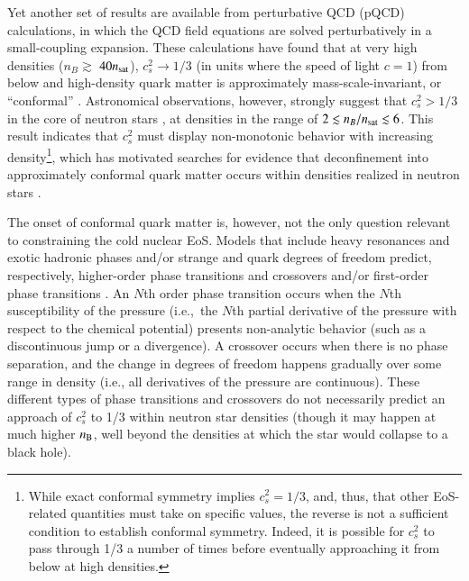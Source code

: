 \documentclass[aps,prd,nofootinbib,tightenlines,notitlepage,floatfix,superscriptaddress,showkeys,twocolumn]{revtex4-1}
\begin{document}
Yet another set of results are available from perturbative QCD (pQCD) calculations, in which the QCD field equations are solved perturbatively in a small-coupling expansion. These calculations have found that at very high densities ($n_B \gtrsim$ $40 n_{\rm sat}$), $c_s^2 \rightarrow 1/3$ (in units where the speed of light $c=1$) from below and high-density quark matter is approximately mass-scale-invariant, or ``conformal'' \cite{Kurkela:2009gj,Kurkela:2014vha,Gorda:2021znl}. Astronomical observations, however, strongly suggest that $c_s^2 > 1/3$ in the core of neutron stars \cite{Legred:2021hdx}, at densities in the range of $2\lesssim n_B/n_{\rm sat} \lesssim 6$. This result indicates that $c_s^2$ must display non-monotonic behavior with increasing density\footnote{While exact conformal symmetry implies $c_s^2 = 1/3$, and, thus, that other EoS-related quantities must take on specific values, the reverse is not a sufficient condition to establish conformal symmetry. Indeed, it is possible for $c_s^2$ to pass through 1/3 a number of times before eventually approaching it from below at high densities.}, which has motivated searches for evidence that deconfinement into approximately conformal quark matter occurs within densities realized in neutron stars \cite{Annala:2023cwx,Annala:2021gom,Annala:2019puf,Marczenko:2022jhl}. 

The onset of conformal quark matter is, however, not the only question relevant to constraining the cold nuclear EoS. Models that include heavy resonances and exotic hadronic phases and/or strange and quark degrees of freedom predict, respectively, higher-order phase transitions and crossovers and/or first-order phase transitions \cite{Buballa:2014jta,Ferreira:2020kvu, Jakobus:2020nxw,Dutra:2015hxa,McLerran:2018hbz, Li:2019fqe,Alford:2017qgh,Zacchi:2015oma,Alvarez-Castillo:2018pve,Zacchi:2019ayh,Zhao:2020dvu,Minamikawa:2020jfj,Duarte:2020xsp,Sen:2020qcd,Minamikawa:2020jfj,Pisarski:2021aoz,Stone:2019blq,Kapusta:2021ney,Somasundaram:2021ljr,Motornenko:2019arp,Baym:2019iky,Baym:2017whm,Malfatti:2020onm}. An $N$th order phase transition occurs when the $N$th susceptibility of the pressure (i.e.,~the $N$th partial derivative of the pressure with respect to the chemical potential) presents non-analytic behavior (such as a discontinuous jump or a divergence). A crossover occurs when there is no phase separation, and the change in degrees of freedom happens gradually over some range in density (i.e., all derivatives of the pressure are continuous). These different types of phase transitions and crossovers do not necessarily predict an approach of $c_s^2$ to 1/3 within neutron star densities (though it may happen at much higher $n_{\rm B}$, well beyond the densities at which the star would collapse to a black hole). 
\end{document}

